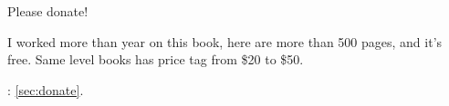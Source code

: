 \begin{center}
\vspace*{\fill}

\Huge{}
{Please donate}!
\normalsize

\bigskip
\bigskip
\bigskip

\Large{}
{I worked more than year on this book, here are more than 500 pages, and it's free.
Same level books has price tag from \$20 to \$50.}
\normalsize

\bigskip
\bigskip
\bigskip

: \ref{sec:donate}.

\vspace*{\fill}
\vfill
\end{center}
